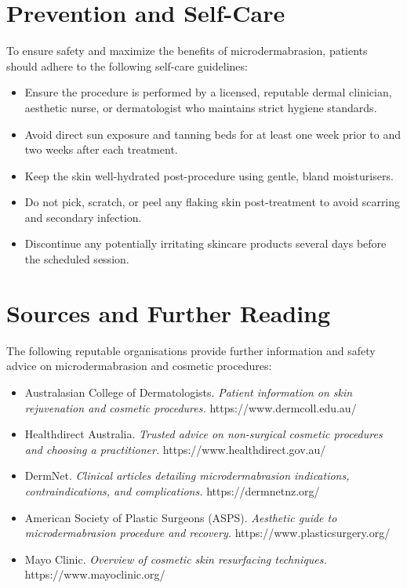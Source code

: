 \section*{Prevention and Self-Care}
To ensure safety and maximize the benefits of microdermabrasion, patients should adhere to the following self-care guidelines:
\begin{itemize}
    \item Ensure the procedure is performed by a licensed, reputable dermal clinician, aesthetic nurse, or dermatologist who maintains strict hygiene standards.
    \item Avoid direct sun exposure and tanning beds for at least one week prior to and two weeks after each treatment.
    \item Keep the skin well-hydrated post-procedure using gentle, bland moisturisers.
    \item Do not pick, scratch, or peel any flaking skin post-treatment to avoid scarring and secondary infection.
    \item Discontinue any potentially irritating skincare products several days before the scheduled session.
\end{itemize}

\section*{Sources and Further Reading}
The following reputable organisations provide further information and safety advice on microdermabrasion and cosmetic procedures:
\begin{itemize}
    \item Australasian College of Dermatologists. \textit{Patient information on skin rejuvenation and cosmetic procedures.} https://www.dermcoll.edu.au/
    \item Healthdirect Australia. \textit{Trusted advice on non-surgical cosmetic procedures and choosing a practitioner.} https://www.healthdirect.gov.au/
    \item DermNet. \textit{Clinical articles detailing microdermabrasion indications, contraindications, and complications.} https://dermnetnz.org/
    \item American Society of Plastic Surgeons (ASPS). \textit{Aesthetic guide to microdermabrasion procedure and recovery.} https://www.plasticsurgery.org/
    \item Mayo Clinic. \textit{Overview of cosmetic skin resurfacing techniques.} https://www.mayoclinic.org/
\end{itemize}
